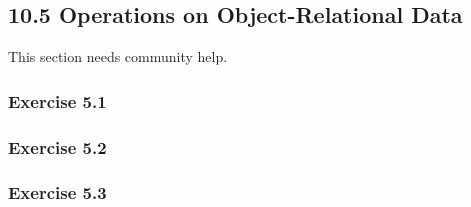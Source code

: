 \documentclass[../../main.tex]{subfiles}
\begin{document}
\subsection{10.5 Operations on Object-Relational Data}

This section needs community help.

\subsubsection*{Exercise 5.1}

\subsubsection*{Exercise 5.2}

\subsubsection*{Exercise 5.3}
\end{document}
